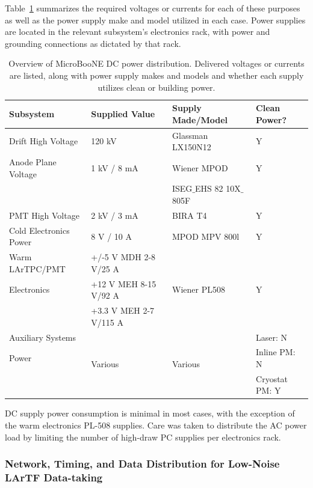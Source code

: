Table~\ref{tab:DCPower} summarizes the required voltages or currents for each of these purposes as well as the power supply make and model utilized in each case.  Power supplies are located in the relevant subsystem's electronics rack, with power and grounding connections as dictated by that rack.

\begin{table}[!htb]
	\centering
	  \caption{Overview of MicroBooNE DC power distribution.  Delivered voltages or currents are listed, along with power supply makes and models and whether each supply utilizes clean or building power.}
    \begin{tabular}{llll}
     \hline
      Subsystem & Supplied Value & Supply Made/Model & Clean Power? \\ 
      \hline
      Drift High Voltage & 120 kV & Glassman LX150N12 & Y \\ 
      \hline
      Anode Plane Voltage & 1 kV / 8 mA & Wiener MPOD  & Y \\ 
      & & ISEG$\_$EHS 82 10X$\_$805F  &\\ 
      \hline
      PMT High Voltage & 2 kV / 3 mA & BIRA T4 & Y \\ 
      \hline
      Cold Electronics Power & 8 V / 10 A & MPOD MPV 800l & Y \\ 
      \hline
      Warm LArTPC/PMT& +/-5 V MDH 2-8 V/25 A& \multirow{3}{*}{Wiener PL508} & \multirow{3}{*}{Y}\\
       Electronics & +12 V MEH 8-15 V/92 A & & \\ 
      & +3.3 V MEH 2-7 V/115 A & & \\ 
      \hline
       Auxiliary Systems & \multirow{3}{*}{Various} & \multirow{3}{*}{Various} & Laser: N \\
      Power &&& Inline PM: N \\
      &&& Cryostat PM: Y \\ 
      \hline
  \end{tabular}
  \label{tab:DCPower}
\end{table}

DC supply power consumption is minimal in most cases, with the exception of the warm \lartpc electronics PL-508 supplies.  Care was taken to distribute the AC power load by limiting the number of high-draw PC supplies per electronics rack.

\subsubsection{Network, Timing, and Data Distribution for Low-Noise LArTF Data-taking}

